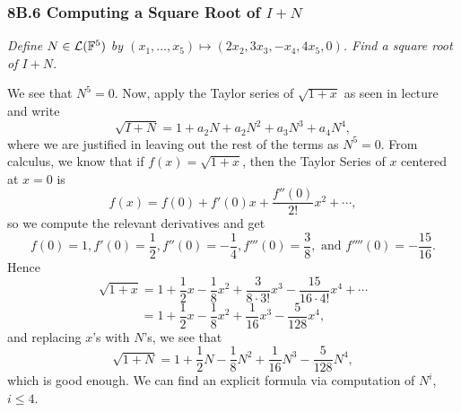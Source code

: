 \documentclass{article}
\begin{document}
\subsubsection*{8B.6 Computing a Square Root of $I+N$}
\textit{Define $N\in\mathcal L(\mathbb F^5)$ by $(x_1,\ldots, x_5)\mapsto (2x_2, 3x_3, -x_4, 4x_5, 0)$. Find a square root of $I+N$.}
\begin{solution}
We see that $N^5 = 0$. Now, apply the Taylor series of $\sqrt{1+x}$ as seen in lecture and write
$$\sqrt{I+N} = 1 + a_2N + a_2N^2 + a_3N^3 + a_4N^4,$$
where we are justified in leaving out the rest of the terms as $N^5=0$. From calculus, we know that if $f(x) = \sqrt{1+x}$, then the Taylor Series of $x$ centered at $x=0$ is
$$f(x) = f(0) + f'(0)x + \frac{f''(0)}{2!}x^2 + \cdots,$$
so we compute the relevant derivatives and get
$$f(0) = 1, f'(0) = \frac 12, f''(0) = -\frac 14, f'''(0) = \frac 38, \textrm{ and } f''''(0) = -\frac{15}{16}.$$
Hence
$$\sqrt{1+x} = 1 + \frac 12x-\frac 18x^2 + \frac 3{8\cdot 3!}x^3 -\frac{15}{16\cdot 4!}x^4+\cdots$$
$$=1 + \frac 12x - \frac 18x^2 + \frac{1}{16}x^3-\frac5{128}x^4,$$
and replacing $x$'s with $N$'s, we see that
$$\sqrt{1+N} = \boxed{1 + \frac 12N - \frac 18N^2+\frac 1{16}N^3 - \frac 5{128}N^4},$$
which is good enough. We can find an explicit formula via computation of $N^i$, $i\leq 4$.
\end{solution}
\newpage
\end{document}
